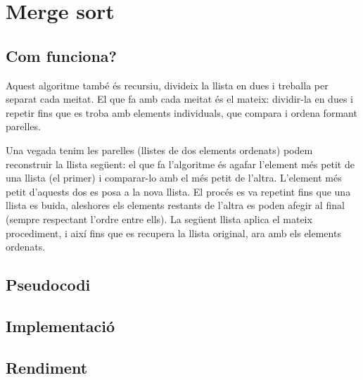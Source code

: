 \chapter{Merge sort}

\section{Com funciona?}
Aquest algoritme també és recursiu, divideix la llista en dues i treballa per separat cada meitat. El que fa amb cada meitat és el mateix: dividir-la en dues i repetir fins que es troba amb elements individuals, que compara i ordena formant parelles.

Una vegada tenim les parelles (llistes de dos elements ordenats) podem reconstruir la llista següent: el que fa l'algoritme és agafar l'element més petit de una llista (el primer) i comparar-lo amb el més petit de l'altra. L'element més petit d'aquests dos es posa a la nova llista. El procés es va repetint fins que una llista es buida, aleshores els elements restants de l'altra es poden afegir al final (sempre respectant l'ordre entre ells).
La següent llista aplica el mateix procediment, i així fins que es recupera la llista original, ara amb els elements ordenats.
\section{Pseudocodi}

\section{Implementació}


\section{Rendiment}
\noindent
\makebox[\textwidth][c]{
	
}
\vspace*{1em}

